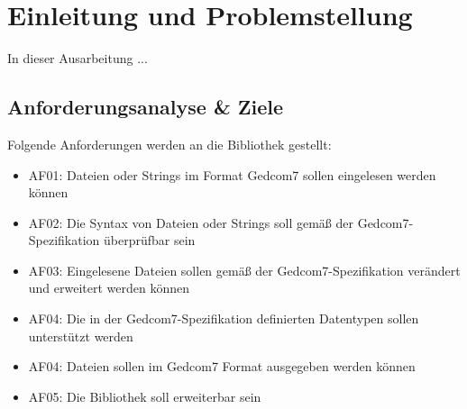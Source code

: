 \chapter{Einleitung und Problemstellung}
\label{chap: Einleitung und Problemstellung}
In dieser Ausarbeitung ...

\section{Anforderungsanalyse \& Ziele}
\label{Anforderungsanalyse und Ziele}
Folgende Anforderungen werden an die Bibliothek gestellt: 
\begin{itemize}
	\item AF01: Dateien oder Strings im Format Gedcom7 sollen eingelesen werden können
	\item AF02: Die Syntax von Dateien oder Strings soll gemäß der Gedcom7-Spezifikation überprüfbar sein 
	\item AF03: Eingelesene Dateien sollen gemäß der Gedcom7-Spezifikation verändert und erweitert werden können
	\item AF04: Die in der Gedcom7-Spezifikation definierten Datentypen sollen unterstützt werden
	\item AF04: Dateien sollen im Gedcom7 Format ausgegeben werden können 
	\item AF05: Die Bibliothek soll erweiterbar sein  
\end{itemize}
